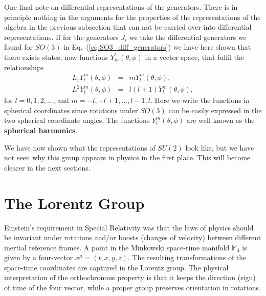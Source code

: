 \documentclass[notes.tex]{subfiles}
\begin{document}
One final note on differential representations of the generators. There is in principle nothing in the arguments for the properties of the representations of the algebra in the previous subsection that can not be carried over into differential representations. If for the generators $J_i$ we take the differential generators we found for $SO(3)$ in Eq.~(\ref{eq:SO3_diff_generators}) we have here shown that there exists states, now functions $Y_m^l(\theta,\phi)$ in a vector space,  that fulfil the relationships
\begin{eqnarray*}
L_z Y_l^m(\theta,\phi) &=& mY_l^m(\theta,\phi), \\
L^2 Y_l^m(\theta,\phi) &=& l(l+1)Y_l^m(\theta,\phi),
\end{eqnarray*}
for $l=0,1,2,\ldots$, and $m=-l,-l+1,\ldots,l-1,l$. Here we write the functions in spherical coordinates since rotations under $SO(3)$ can be easily expressed in the two spherical coordinate angles. The functions $Y_l^m(\theta,\phi)$ are well known as the {\bf spherical harmonics}.

We have now shown what the representations of $SU(2)$ look like, but we have not seen why this group appears in physics in the first place. This will become clearer in the next sections.



\section{The Lorentz Group}
\label{sec:Lorentz_group}
Einstein's requirement in Special Relativity was that the laws of physics should be invariant under rotations and/or boosts (changes of velocity) between different inertial reference frames. A point in the Minkowski space-time manifold $\mathbb{M}_4$ is given by a four-vector $x^\mu = (t,x,y,z)$. The resulting transformations of the space-time coordinates are captured in the Lorentz group.
The physical interpretation of the orthochronous property is that it keeps the direction (sign) of time of the four vector, while a proper group preserves orientation in rotations.
\end{document}
